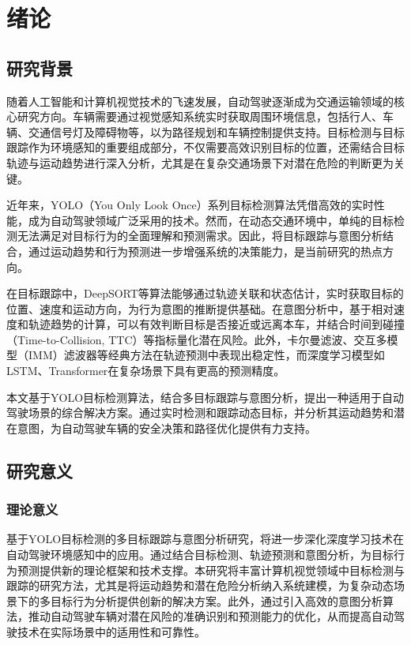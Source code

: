 \chapter{绪论}



\section{研究背景}

随着人工智能和计算机视觉技术的飞速发展，自动驾驶逐渐成为交通运输领域的核心研究方向。车辆需要通过视觉感知系统实时获取周围环境信息，包括行人、车辆、交通信号灯及障碍物等，以为路径规划和车辆控制提供支持。目标检测与目标跟踪作为环境感知的重要组成部分，不仅需要高效识别目标的位置，还需结合目标轨迹与运动趋势进行深入分析，尤其是在复杂交通场景下对潜在危险的判断更为关键。

近年来，YOLO（You Only Look Once）系列目标检测算法凭借高效的实时性能，成为自动驾驶领域广泛采用的技术。然而，在动态交通环境中，单纯的目标检测无法满足对目标行为的全面理解和预测需求。因此，将目标跟踪与意图分析结合，通过运动趋势和行为预测进一步增强系统的决策能力，是当前研究的热点方向。

在目标跟踪中，DeepSORT等算法能够通过轨迹关联和状态估计，实时获取目标的位置、速度和运动方向，为行为意图的推断提供基础。在意图分析中，基于相对速度和轨迹趋势的计算，可以有效判断目标是否接近或远离本车，并结合时间到碰撞（Time-to-Collision, TTC）等指标量化潜在风险。此外，卡尔曼滤波、交互多模型（IMM）滤波器等经典方法在轨迹预测中表现出稳定性，而深度学习模型如LSTM、Transformer在复杂场景下具有更高的预测精度。

本文基于YOLO目标检测算法，结合多目标跟踪与意图分析，提出一种适用于自动驾驶场景的综合解决方案。通过实时检测和跟踪动态目标，并分析其运动趋势和潜在意图，为自动驾驶车辆的安全决策和路径优化提供有力支持。

\section{研究意义}

\subsection{理论意义}

基于YOLO目标检测的多目标跟踪与意图分析研究，将进一步深化深度学习技术在自动驾驶环境感知中的应用。通过结合目标检测、轨迹预测和意图分析，为目标行为预测提供新的理论框架和技术支撑。本研究将丰富计算机视觉领域中目标检测与跟踪的研究方法，尤其是将运动趋势和潜在危险分析纳入系统建模，为复杂动态场景下的多目标行为分析提供创新的解决方案。此外，通过引入高效的意图分析算法，推动自动驾驶车辆对潜在风险的准确识别和预测能力的优化，从而提高自动驾驶技术在实际场景中的适用性和可靠性。


